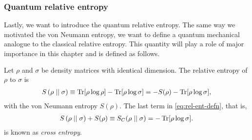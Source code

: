 \subsubsection{Quantum relative entropy}
Lastly, we want to introduce the quantum relative entropy. 
The same way we
motivated the von Neumann entropy, we want to define a quantum mechanical
analogue to the classical relative entropy. This quantity will play a role of
major importance in this chapter and is defined as follows.

\begin{defn}\label{defn:rel-ent}
  Let $\rho$ and $\sigma$ be density matrices with identical dimension. The
  relative entropy of $\rho$ to $\sigma$ is
  \begin{align}\label{eq:rel-ent-defn}
    S\left(\rho\mid\mid\sigma\right) \equiv \Tr[\rho\log\rho] -
    \Tr[\rho\log\sigma] = -S(\rho) - \Tr[\rho\log\sigma]
  ,\end{align}
  with the von Neumann entropy $S(\rho)$.
  The last term in \cref{eq:rel-ent-defn}, that is, 
  \begin{align}
    S\left( \rho\mid\mid\sigma \right) + S(\rho) \equiv S_C(\rho\mid\mid\sigma) = -\Tr[\rho\log\sigma]
  .\end{align}
  is known as \emph{cross entropy}. 
\end{defn}

